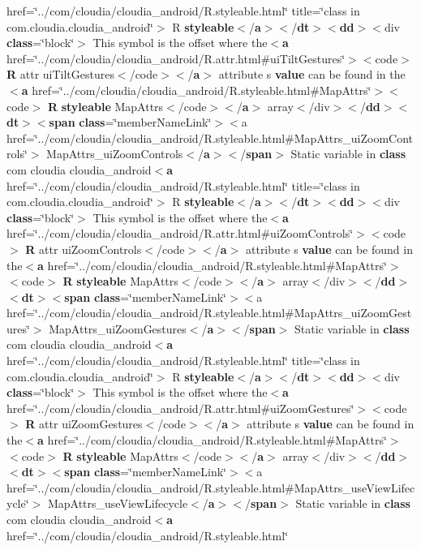 {href=\char`\"{}../com/cloudia/cloudia\-\_\-android/R.\-styleable.\-html\char`\"{} title=\char`\"{}class in com.\-cloudia.\-cloudia\-\_\-android\char`\"{}$>$ R {\bf styleable}$<$/{\bf a}$>$$<$/{\bf dt}$>$$<${\bf dd}$>$$<$div {\bf class}=\char`\"{}block\char`\"{}$>$ This symbol is the offset where the$<${\bf a} href=\char`\"{}../com/cloudia/cloudia\-\_\-android/R.\-attr.\-html\#ui\-Tilt\-Gestures\char`\"{}$>$$<$code$>$ {\bf R} attr ui\-Tilt\-Gestures$<$/code$>$$<$/{\bf a}$>$ attribute s {\bf value} can be found in the$<${\bf a} href=\char`\"{}../com/cloudia/cloudia\-\_\-android/R.\-styleable.\-html\#Map\-Attrs\char`\"{}$>$$<$code$>$ {\bf R} {\bf styleable} Map\-Attrs$<$/code$>$$<$/{\bf a}$>$ array$<$/div$>$$<$/{\bf dd}$>$$<${\bf dt}$>$$<${\bf span} {\bf class}=\char`\"{}member\-Name\-Link\char`\"{}$>$$<$a href=\char`\"{}../com/cloudia/cloudia\-\_\-android/R.\-styleable.\-html\#Map\-Attrs\-\_\-ui\-Zoom\-Controls\char`\"{}$>$ Map\-Attrs\-\_\-ui\-Zoom\-Controls$<$/{\bf a}$>$$<$/{\bf span}$>$ Static variable in {\bf class} com cloudia cloudia\-\_\-android$<${\bf a} href=\char`\"{}../com/cloudia/cloudia\-\_\-android/R.\-styleable.\-html\char`\"{} title=\char`\"{}class in com.\-cloudia.\-cloudia\-\_\-android\char`\"{}$>$ R {\bf styleable}$<$/{\bf a}$>$$<$/{\bf dt}$>$$<${\bf dd}$>$$<$div {\bf class}=\char`\"{}block\char`\"{}$>$ This symbol is the offset where the$<${\bf a} href=\char`\"{}../com/cloudia/cloudia\-\_\-android/R.\-attr.\-html\#ui\-Zoom\-Controls\char`\"{}$>$$<$code$>$ {\bf R} attr ui\-Zoom\-Controls$<$/code$>$$<$/{\bf a}$>$ attribute s {\bf value} can be found in the$<${\bf a} href=\char`\"{}../com/cloudia/cloudia\-\_\-android/R.\-styleable.\-html\#Map\-Attrs\char`\"{}$>$$<$code$>$ {\bf R} {\bf styleable} Map\-Attrs$<$/code$>$$<$/{\bf a}$>$ array$<$/div$>$$<$/{\bf dd}$>$$<${\bf dt}$>$$<${\bf span} {\bf class}=\char`\"{}member\-Name\-Link\char`\"{}$>$$<$a href=\char`\"{}../com/cloudia/cloudia\-\_\-android/R.\-styleable.\-html\#Map\-Attrs\-\_\-ui\-Zoom\-Gestures\char`\"{}$>$ Map\-Attrs\-\_\-ui\-Zoom\-Gestures$<$/{\bf a}$>$$<$/{\bf span}$>$ Static variable in {\bf class} com cloudia cloudia\-\_\-android$<${\bf a} href=\char`\"{}../com/cloudia/cloudia\-\_\-android/R.\-styleable.\-html\char`\"{} title=\char`\"{}class in com.\-cloudia.\-cloudia\-\_\-android\char`\"{}$>$ R {\bf styleable}$<$/{\bf a}$>$$<$/{\bf dt}$>$$<${\bf dd}$>$$<$div {\bf class}=\char`\"{}block\char`\"{}$>$ This symbol is the offset where the$<${\bf a} href=\char`\"{}../com/cloudia/cloudia\-\_\-android/R.\-attr.\-html\#ui\-Zoom\-Gestures\char`\"{}$>$$<$code$>$ {\bf R} attr ui\-Zoom\-Gestures$<$/code$>$$<$/{\bf a}$>$ attribute s {\bf value} can be found in the$<${\bf a} href=\char`\"{}../com/cloudia/cloudia\-\_\-android/R.\-styleable.\-html\#Map\-Attrs\char`\"{}$>$$<$code$>$ {\bf R} {\bf styleable} Map\-Attrs$<$/code$>$$<$/{\bf a}$>$ array$<$/div$>$$<$/{\bf dd}$>$$<${\bf dt}$>$$<${\bf span} {\bf class}=\char`\"{}member\-Name\-Link\char`\"{}$>$$<$a href=\char`\"{}../com/cloudia/cloudia\-\_\-android/R.\-styleable.\-html\#Map\-Attrs\-\_\-use\-View\-Lifecycle\char`\"{}$>$ Map\-Attrs\-\_\-use\-View\-Lifecycle$<$/{\bf a}$>$$<$/{\bf span}$>$ Static variable in {\bf class} com cloudia cloudia\-\_\-android$<${\bf a} href=\char`\"{}../com/cloudia/cloudia\-\_\-android/R.\-styleable.\-html\char`\"{} }
